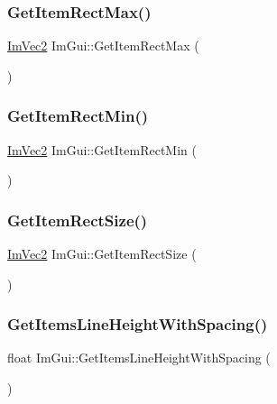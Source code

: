 \subsubsection{\texorpdfstring{Get\+Item\+Rect\+Max()}{GetItemRectMax()}}
{\footnotesize\ttfamily \hyperlink{struct_im_vec2}{Im\+Vec2} Im\+Gui\+::\+Get\+Item\+Rect\+Max (\begin{DoxyParamCaption}{ }\end{DoxyParamCaption})}

\hypertarget{namespace_im_gui_a65b24b72ec0e8444c705cebf3e91f570}{}\label{namespace_im_gui_a65b24b72ec0e8444c705cebf3e91f570} 
\subsubsection{\texorpdfstring{Get\+Item\+Rect\+Min()}{GetItemRectMin()}}
{\footnotesize\ttfamily \hyperlink{struct_im_vec2}{Im\+Vec2} Im\+Gui\+::\+Get\+Item\+Rect\+Min (\begin{DoxyParamCaption}{ }\end{DoxyParamCaption})}

\hypertarget{namespace_im_gui_a3303d1c37041307e11fd46fc43b2274d}{}\label{namespace_im_gui_a3303d1c37041307e11fd46fc43b2274d} 
\subsubsection{\texorpdfstring{Get\+Item\+Rect\+Size()}{GetItemRectSize()}}
{\footnotesize\ttfamily \hyperlink{struct_im_vec2}{Im\+Vec2} Im\+Gui\+::\+Get\+Item\+Rect\+Size (\begin{DoxyParamCaption}{ }\end{DoxyParamCaption})}

\hypertarget{namespace_im_gui_a85a5202a65c0663858dba55a206761c5}{}\label{namespace_im_gui_a85a5202a65c0663858dba55a206761c5} 
\subsubsection{\texorpdfstring{Get\+Items\+Line\+Height\+With\+Spacing()}{GetItemsLineHeightWithSpacing()}}
{\footnotesize\ttfamily float Im\+Gui\+::\+Get\+Items\+Line\+Height\+With\+Spacing (\begin{DoxyParamCaption}{ }\end{DoxyParamCaption})}

